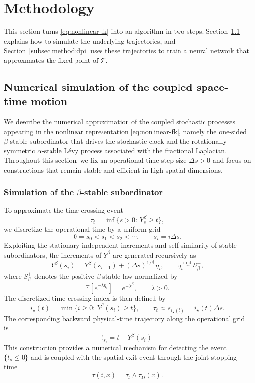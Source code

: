 \documentclass[a4paper,fleqn]{cas-sc}
\begin{document}
\section{Methodology}\label{sec:method}

This section turns \eqref{eq:nonlinear-fk} into an algorithm in two steps.
Section~\ref{subsec:sim-paths} explains how to simulate the underlying
trajectories, and Section~\ref{subsec:method:dpi} uses these trajectories to
train a neural network that approximates the fixed point of $\mathcal{T}$.

\subsection{Numerical simulation of the coupled space-time motion}
\label{subsec:sim-paths}

We describe the numerical approximation of the coupled stochastic processes
appearing in the nonlinear representation \eqref{eq:nonlinear-fk}, namely the
one-sided $\beta$-stable subordinator that drives the stochastic clock and the
rotationally symmetric $\alpha$-stable L\'evy process associated with the
fractional Laplacian. Throughout this section, we fix an operational-time step
size $\Delta s>0$ and focus on constructions that remain stable and efficient
in high spatial dimensions.

\subsubsection{Simulation of the $\beta$-stable subordinator}

To approximate the time-crossing event
\[
\tau_t=\inf\{s>0:\,Y_s^\beta\ge t\},
\]
we discretize the operational time by a uniform grid
\begin{equation}\label{eq:grid-rewrite}
0=s_0<s_1<s_2<\cdots,\qquad s_i=i\Delta s .
\end{equation}
Exploiting the stationary independent increments and self-similarity of stable
subordinators, the increments of $Y^\beta$ are generated recursively as
\begin{equation}\label{eq:Y-recursion-rewrite}
Y^\beta(s_i)
=
Y^\beta(s_{i-1})
+
(\Delta s)^{1/\beta}\,\eta_i,
\qquad
\eta_i\stackrel{\mathrm{i.i.d.}}{\sim} S_\beta^+,
\end{equation}
where $S_\beta^+$ denotes the positive $\beta$-stable law normalized by
\[
\mathbb{E}\!\left[e^{-\lambda\eta_i}\right]
=
e^{-\lambda^\beta},
\qquad \lambda>0.
\]
The discretized time-crossing index is then defined by
\begin{equation}\label{eq:tau-physical-rewrite}
i_\star(t)
=
\min\{i\ge0:\,Y^\beta(s_i)\ge t\},
\qquad
\tau_t\approx s_{i_\star(t)}=i_\star(t)\Delta s .
\end{equation}
The corresponding backward physical-time trajectory along the operational grid is
\[
t_{s_i}=t-Y^\beta(s_i).
\]
This construction provides a numerical mechanism for detecting the event
$\{t_s\le0\}$ and is coupled with the spatial exit event through the joint
stopping time
\[
\tau(t,x)=\tau_t\wedge\tau_\Omega(x).
\]
\end{document}
